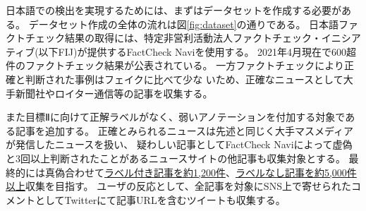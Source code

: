 
\vspace{20pt}
日本語での検出を実現するためには、まずはデータセットを作成する必要がある。
データセット作成の全体の流れは図\ref{fig:dataset}の通りである。
日本語ファクトチェック結果の取得には、特定非営利活動法人ファクトチェック・イニシアティブ(以下FIJ)が提供するFactCheck Naviを使用する。
2021年4月現在で600超件のファクトチェック結果が公表されている。%
一方ファクトチェックにより正確と判断された事例はフェイクに比べて少な%
いため、正確なニュースとして大手新聞社やロイター通信等の記事を収集する。

また目標Ⅱに向けて正解ラベルがなく、弱いアノテーションを付加する対象である記事を追加する。
正確とみられるニュースは先述と同じく大手マスメディアが発信したニュースを扱い、
疑わしい記事としてFactCheck Naviによって虚偽と3回以上判断されたことがあるニュースサイトの他記事も収集対象とする。
最終的には真偽合わせて\underline{ラベル付き記事を約1,200件}、\underline{ラベルなし記事を約5,000件以上}収集を目指す。
ユーザの反応として、全記事を対象にSNS上で寄せられたコメントとしてTwitterにて記事URLを含むツイートも収集する。

